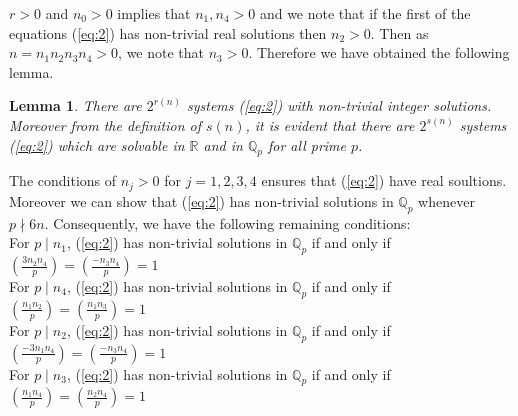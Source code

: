 \documentclass[11pt]{article}
\newcommand{\Qp}{ {\mathbb{Q}_p} }
\newtheorem{lemma}[theorem]{Lemma}
\begin{document}
\noindent $r>0$ and $n_{0}>0$ implies that $n_{1},n_{4}>0$ and we note that if the first of the equations (\ref{eq:2}) has non-trivial real solutions then $n_{2}>0$. Then as $n=n_{1}n_{2}n_{3}n_{4}>0$, we note that $n_{3}>0$. Therefore we have obtained the following lemma.
\begin{lemma}\label{lemma1}
There are $2^{r(n)}$ systems (\ref{eq:2}) with non-trivial integer solutions. Moreover from the definition of $s(n)$, it is evident that there are $2^{s(n)}$ systems (\ref{eq:2}) which are solvable in $\mathbb{R}$ and in $\Qp$ for all prime $p$. 
\end{lemma}
\noindent The conditions of $n_{j}>0$ for $j=1,2,3,4$ ensures that (\ref{eq:2}) have real soultions. Moreover we can show that (\ref{eq:2}) has non-trivial solutions in $\Qp$ whenever $p\nmid 6n$. Consequently, we have the following remaining conditions: \\

\noindent For $p\mid n_{1}$, (\ref{eq:2}) has non-trivial solutions in $\Qp$ if and only if $ \left(\frac{3n_{2}n_{4}}{p}\right) = \left(\frac{-n_{3}n_{4}}{p}\right)= 1$\\
For $p\mid n_{4}$, (\ref{eq:2}) has non-trivial solutions in $\Qp$ if and only if $ \left(\frac{n_{1}n_{2}}{p}\right) = \left(\frac{n_{1}n_{3}}{p}\right)= 1$\\
For $p\mid n_{2}$, (\ref{eq:2}) has non-trivial solutions in $\Qp$ if and only if $ \left(\frac{-3n_{1}n_{4}}{p}\right) = \left(\frac{-n_{3}n_{4}}{p}\right)= 1$\\
For $p\mid n_{3}$, (\ref{eq:2}) has non-trivial solutions in $\Qp$ if and only if $ \left(\frac{n_{1}n_{4}}{p}\right) = \left(\frac{n_{2}n_{4}}{p}\right)= 1$\\
\end{document}
